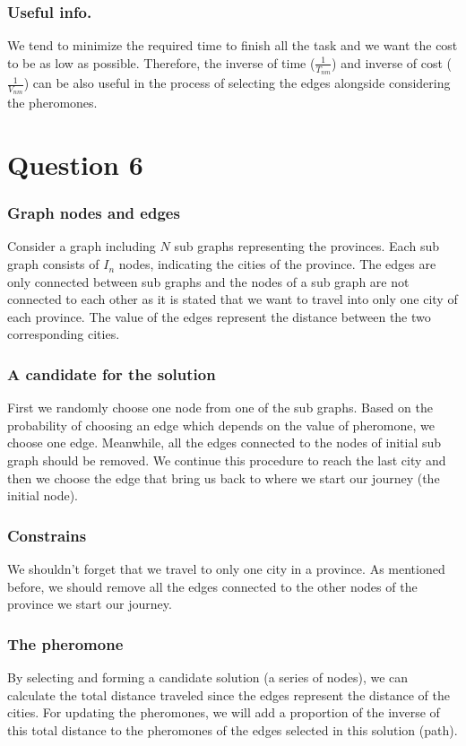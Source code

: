 \documentclass[]{article}
\begin{document}
	\subsubsection*{Useful info.}
	We tend to minimize the required time to finish all the task and we want the cost to be as low as possible. Therefore, the inverse of time ($\frac{1}{T_{nm}}$) and inverse of cost ($\frac{1}{V_{nm}}$) can be also useful in the process of selecting the edges alongside considering the pheromones.
	
	\section{Question 6}
	\subsubsection*{Graph nodes and edges}
	Consider a graph including $N$ sub graphs representing the provinces. Each sub graph consists of $I_n$ nodes, indicating the cities of the province. The edges are only connected between sub graphs and the nodes of a sub graph are not connected to each other as it is stated that we want to travel into only one city of each province. The value of the edges represent the distance between the two corresponding cities.
	
	\subsubsection*{A candidate for the solution}
	First we randomly choose one node from one of the sub graphs. Based on the probability of choosing an edge which depends on the value of pheromone, we choose one edge. Meanwhile, all the edges connected to the nodes of initial sub graph should be removed. We continue this procedure to reach the last city and then we choose the edge that bring us back to where we start our journey (the initial node).
	
	\subsubsection*{Constrains}
	We shouldn't forget that we travel to only one city in a province.  As mentioned before, we  should remove all the edges connected to the other nodes of the province we start our journey.
	
	\subsubsection*{The pheromone}
	By selecting and forming a candidate solution (a series of nodes), we can calculate the total distance traveled since the edges represent the distance of the cities. For updating the pheromones, we will add a proportion of the inverse of this total distance to the pheromones of the edges selected in this solution (path).
	
\end{document}

